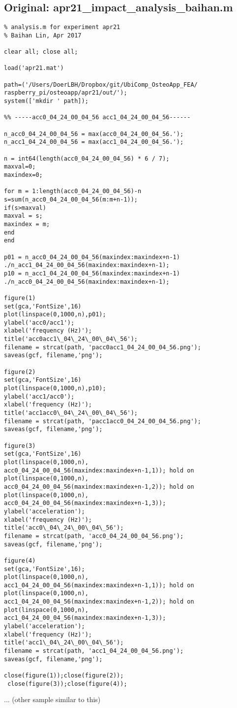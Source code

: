 \documentclass{sigchi}
\begin{document}
\subsection{Original: apr21\_impact\_analysis\_baihan.m}\label{ss:imp_ana.m}
\begin{lstlisting}
% analysis.m for experiment apr21 
% Baihan Lin, Apr 2017

clear all; close all;

load('apr21.mat')

path=('/Users/DoerLBH/Dropbox/git/UbiComp_OsteoApp_FEA/
raspberry_pi/osteoapp/apr21/out/');
system(['mkdir ' path]);

%% -----acc0_04_24_00_04_56 acc1_04_24_00_04_56------

n_acc0_04_24_00_04_56 = max(acc0_04_24_00_04_56.');
n_acc1_04_24_00_04_56 = max(acc1_04_24_00_04_56.');

n = int64(length(acc0_04_24_00_04_56) * 6 / 7);
maxval=0;
maxindex=0;

for m = 1:length(acc0_04_24_00_04_56)-n
s=sum(n_acc0_04_24_00_04_56(m:m+n-1));
if(s>maxval)
maxval = s;
maxindex = m;
end
end

p01 = n_acc0_04_24_00_04_56(maxindex:maxindex+n-1)
./n_acc1_04_24_00_04_56(maxindex:maxindex+n-1);
p10 = n_acc1_04_24_00_04_56(maxindex:maxindex+n-1)
./n_acc0_04_24_00_04_56(maxindex:maxindex+n-1);

figure(1)
set(gca,'FontSize',16)
plot(linspace(0,1000,n),p01);
ylabel('acc0/acc1');
xlabel('frequency (Hz)');
title('acc0acc1\_04\_24\_00\_04\_56');
filename = strcat(path, 'pacc0acc1_04_24_00_04_56.png');
saveas(gcf, filename,'png');

figure(2)
set(gca,'FontSize',16)
plot(linspace(0,1000,n),p10);
ylabel('acc1/acc0');
xlabel('frequency (Hz)');
title('acc1acc0\_04\_24\_00\_04\_56');
filename = strcat(path, 'pacc1acc0_04_24_00_04_56.png');
saveas(gcf, filename,'png');

figure(3)
set(gca,'FontSize',16)
plot(linspace(0,1000,n),
acc0_04_24_00_04_56(maxindex:maxindex+n-1,1)); hold on
plot(linspace(0,1000,n),
acc0_04_24_00_04_56(maxindex:maxindex+n-1,2)); hold on
plot(linspace(0,1000,n),
acc0_04_24_00_04_56(maxindex:maxindex+n-1,3));
ylabel('acceleration');
xlabel('frequency (Hz)');
title('acc0\_04\_24\_00\_04\_56');
filename = strcat(path, 'acc0_04_24_00_04_56.png');
saveas(gcf, filename,'png');

figure(4)
set(gca,'FontSize',16);
plot(linspace(0,1000,n),
acc1_04_24_00_04_56(maxindex:maxindex+n-1,1)); hold on
plot(linspace(0,1000,n),
acc1_04_24_00_04_56(maxindex:maxindex+n-1,2)); hold on
plot(linspace(0,1000,n),
acc1_04_24_00_04_56(maxindex:maxindex+n-1,3));
ylabel('acceleration');
xlabel('frequency (Hz)');
title('acc1\_04\_24\_00\_04\_56');
filename = strcat(path, 'acc1_04_24_00_04_56.png');
saveas(gcf, filename,'png');

close(figure(1));close(figure(2));
 close(figure(3));close(figure(4));
\end{lstlisting}
... (other sample similar to this)
\end{document}
